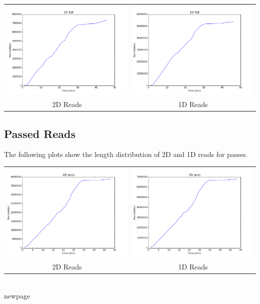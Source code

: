 \documentclass[11pt]{article}
\begin{document}
        \begin{tabular}{cc}
          \includegraphics[width=.48\textwidth]{failcum2D}
          &
          \includegraphics[width=.48\textwidth]{failcum1D}
          \\
          2D Reads
          &
          1D Reads
        \end{tabular}

\subsection*{Passed Reads}

        The following plots show the length distribution of 2D and 1D reads for passes.

        
        \begin{tabular}{cc}
          \includegraphics[width=.48\textwidth]{passcum2D}
          &
          \includegraphics[width=.48\textwidth]{passcum1D}
          \\
          2D Reads
          &
          1D Reads
        \end{tabular}
\\newpage
\end{document}
